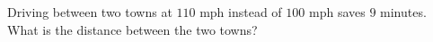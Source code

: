 Driving between two towns at $110$ mph instead of $100$ mph saves $9$ minutes. What is the distance between the two towns?
